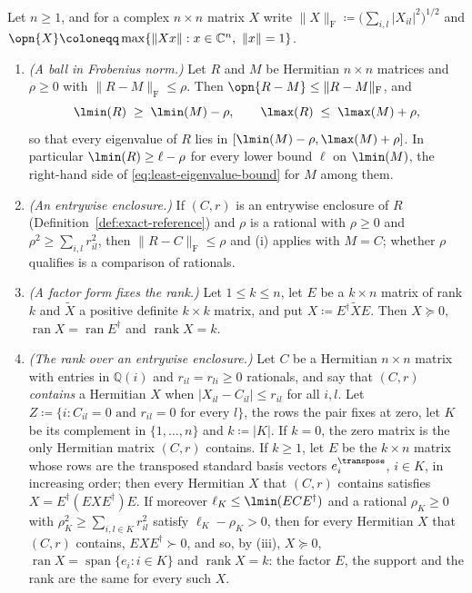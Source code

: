 \begin{corollary}\label{cor:least-eigenvalue-over-enclosure}
Let $n\ge1$, and for a complex $n\times n$ matrix $X$ write
$\|X\|_{\mathrm F}\coloneqq\big(\sum_{i,l}|X_{il}|^{2}\big)^{1/2}$ and
$\opn{X}\coloneqq\max\{\|Xx\|:x\in\mathbb{C}^{n},\ \|x\|=1\}$.
\begin{enumerate}[label=(\roman*),leftmargin=2.4em]
\item \emph{(A ball in Frobenius norm.)} Let $R$ and $M$ be Hermitian
  $n\times n$ matrices and $\rho\ge0$ with $\|R-M\|_{\mathrm F}\le\rho$. Then
  $\opn{R-M}\le\|R-M\|_{\mathrm F}$, and
  \begin{equation}\label{eq:frobenius-ball}
    \lmin(R)\;\ge\;\lmin(M)-\rho,
    \qquad
    \lmax(R)\;\le\;\lmax(M)+\rho,
  \end{equation}
  so that every eigenvalue of $R$ lies in
  $[\lmin(M)-\rho,\lmax(M)+\rho]$. In particular $\lmin(R)\ge\ell-\rho$ for
  every lower bound $\ell$ on $\lmin(M)$, the right-hand side of
  \eqref{eq:least-eigenvalue-bound} for $M$ among them.
\item \emph{(An entrywise enclosure.)} If $(C,r)$ is an entrywise enclosure of
  $R$ (Definition~\ref{def:exact-reference}) and $\rho$ is a rational with
  $\rho\ge0$ and $\rho^{2}\ge\sum_{i,l}r_{il}^{2}$, then
  $\|R-C\|_{\mathrm F}\le\rho$ and (i) applies with $M=C$; whether $\rho$
  qualifies is a comparison of rationals.
\item \emph{(A factor form fixes the rank.)} Let $1\le k\le n$, let $E$ be a
  $k\times n$ matrix of rank $k$ and $\widetilde X$ a positive definite
  $k\times k$ matrix, and put $X\coloneqq E^{\dagger}\widetilde XE$. Then
  $X\succeq0$, $\operatorname{ran}X=\operatorname{ran}E^{\dagger}$ and
  $\operatorname{rank}X=k$.
\item \emph{(The rank over an entrywise enclosure.)} Let $C$ be a Hermitian
  $n\times n$ matrix with entries in $\mathbb{Q}(i)$ and $r_{il}=r_{li}\ge0$
  rationals, and say that $(C,r)$ \emph{contains} a Hermitian $X$ when
  $|X_{il}-C_{il}|\le r_{il}$ for all $i,l$. Let
  $Z\coloneqq\{i:C_{il}=0\text{ and }r_{il}=0\text{ for every }l\}$, the rows
  the pair fixes at zero, let $K$ be its complement in $\{1,\dots,n\}$ and
  $k\coloneqq|K|$. If $k=0$, the zero matrix is the only Hermitian matrix
  $(C,r)$ contains. If $k\ge1$, let $E$ be the $k\times n$ matrix whose rows
  are the transposed standard basis vectors $e_i^{\transpose}$, $i\in K$, in
  increasing order; then every Hermitian $X$ that $(C,r)$ contains satisfies
  $X=E^{\dagger}(EXE^{\dagger})E$. If moreover $\ell_K\le\lmin(ECE^{\dagger})$
  and a rational $\rho_K\ge0$ with $\rho_K^{2}\ge\sum_{i,l\in K}r_{il}^{2}$
  satisfy $\ell_K-\rho_K>0$, then for every Hermitian $X$ that $(C,r)$
  contains, $EXE^{\dagger}\succ0$, and so, by (iii), $X\succeq0$,
  $\operatorname{ran}X=\operatorname{span}\{e_i:i\in K\}$ and
  $\operatorname{rank}X=k$: the factor $E$, the support and the rank are the
  same for every such $X$.
\end{enumerate}
\end{corollary}


